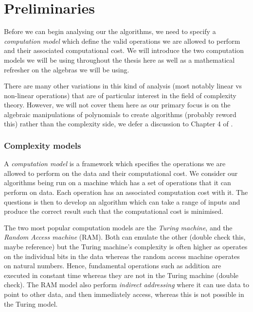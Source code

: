 \chapter{Preliminaries}\label{chp:preliminaries}

Before we can begin analysing our the algorithms, we need to specify a \emph{computation model} which define the valid operations we are allowed to perform and their associated computational cost. We will introduce the two computation models we will be using throughout the thesis here as well as a mathematical refresher on the algebras we will be using.

There are many other variations in this kind of analysis (most notably linear vs non-linear operations) that are of particular interest in the field of complexity theory. However, we will not cover them here as our primary focus is on the algebraic manipulations of polynomials to create algorithms (probably reword this) rather than the complexity side, we defer a discussion to Chapter 4 of \cite{burgisser}.

\subsection{Complexity models}%
\label{sub:Complexity models}

A \textit{computation model} is a framework which specifies the operations we are allowed to perform on the data and their computational cost. We consider our algorithms being run on a machine which has a set of operations that it can perform on data. Each operation has an associated computation cost with it. The questions is then to develop an algorithm which can take a range of inputs and produce the correct result such that the computational cost is minimised.

The two most popular computation models are the \textit{Turing machine}, and the \textit{Random Access machine} (RAM). Both can emulate the other (double check this, maybe reference) but the Turing machine's complexity is often higher as operates on the individual bits in the data whereas the random access machine operates on natural numbers. Hence, fundamental operations such as addition are executed in constant time whereas they are not in the Turing machine (double check). The RAM model also perform \emph{indirect addressing} where it can use data to point to other data, and then immediately access, whereas this is not possible in the Turing model.

